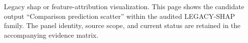 Legacy shap or feature-attribution visualization. This page shows the candidate output ``Comparison prediction scatter'' within the audited LEGACY-SHAP family. The panel identity, source scope, and current status are retained in the accompanying evidence matrix.
